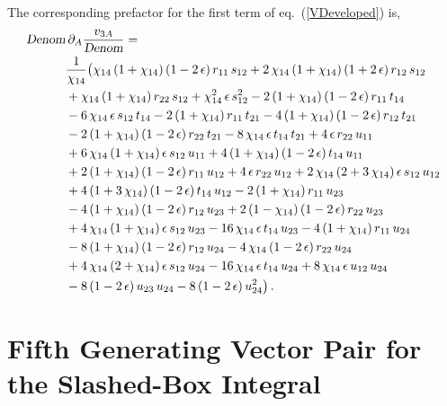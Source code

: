\documentclass[aps,prd,preprint,groupedaddress,nofootinbib,showpacs,eqsecnum]{revtex4}
\def\eqn#1{eq.~(\ref{#1})}
\def\eps{\epsilon}
\begin{document}
The corresponding prefactor for the first term of \eqn{VDeveloped} is,
\begin{equation}
\begin{aligned}
\Denom&\, \partial_A\frac{v_{3A}}{\Denom}
=\\
&\frac{1}{\chi_{14}}\bigl(\chi_{14}\,(1+\chi_{14})\,(1-2\,\eps)\,r_{11}\,s_{12}
+2\,\chi_{14}\,(1+\chi_{14})\,(1+2\,\eps)\,r_{12}\,s_{12}
\\ &
+\chi_{14}\,(1+\chi_{14})\,r_{22}\,s_{12}
+\chi_{14}^{2}\,\eps\,s_{12}^{2}
-2\,(1+\chi_{14})\,(1-2\,\eps)\,r_{11}\,t_{14}
\\ &
-6\,\chi_{14}\,\eps\,s_{12}\,t_{14}
-2\,(1+\chi_{14})\,r_{11}\,t_{21}
-4\,(1+\chi_{14})\,(1-2\,\eps)\,r_{12}\,t_{21}
\\ &
-2\,(1+\chi_{14})\,(1-2\,\eps)\,r_{22}\,t_{21}
-8\,\chi_{14}\,\eps\,t_{14}\,t_{21}+4\,\eps\,r_{22}\,u_{11}
\\ &
+6\,\chi_{14}\,(1+\chi_{14})\,\eps\,s_{12}\,u_{11}
+4\,(1+\chi_{14})\,(1-2\,\eps)\,t_{14}\,u_{11}
\\ &
+2\,(1+\chi_{14})\,(1-2\,\eps)\,r_{11}\,u_{12}
+4\,\eps\,r_{22}\,u_{12}
+2\,\chi_{14}\,(2+3\,\chi_{14})\,\eps\,s_{12}\,u_{12}
\\ &
+4\,(1+3\,\chi_{14})\,(1-2\,\eps)\,t_{14}\,u_{12}
-2\,(1+\chi_{14})\,r_{11}\,u_{23}
\\ &
-4\,(1+\chi_{14})\,(1-2\,\eps)\,r_{12}\,u_{23}
+2\,(1-\chi_{14})\,(1-2\,\eps)\,r_{22}\,u_{23}
\\ &
+4\,\chi_{14}\,(1+\chi_{14})\,\eps\,s_{12}\,u_{23}
-16\,\chi_{14}\,\eps\,t_{14}\,u_{23}
-4\,(1+\chi_{14})\,r_{11}\,u_{24}
\\ &
-8\,(1+\chi_{14})\,(1-2\,\eps)\,r_{12}\,u_{24}
-4\,\chi_{14}\,(1-2\,\eps)\,r_{22}\,u_{24}
\\ &
+4\,\chi_{14}\,(2+\chi_{14})\,\eps\,s_{12}\,u_{24}
-16\,\chi_{14}\,\eps\,t_{14}\,u_{24}
+8\,\chi_{14}\,\eps\,u_{12}\,u_{24}
\\ &
-8\,(1-2\,\eps)\,u_{23}\,u_{24}-8\,(1-2\,\eps)\,u_{24}^{2}\bigr)
\,.
\end{aligned}
\end{equation}

\section{Fifth Generating Vector Pair for the Slashed-Box Integral}
\label{MasslessSlashedBoxVector5Appendix}
\end{document}
